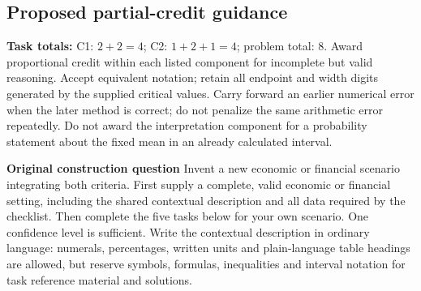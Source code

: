 \secInicio[][sec:p2]

\clearpage

\subsection*{Proposed partial-credit guidance}
\textbf{Task totals:} C1: $2+2=4$; C2: $1+2+1=4$; problem total: 8. Award proportional credit within each listed component for incomplete but valid reasoning. Accept equivalent notation; retain all endpoint and width digits generated by the supplied critical values. Carry forward an earlier numerical error when the later method is correct; do not penalize the same arithmetic error repeatedly. Do not award the interpretation component for a probability statement about the fixed mean in an already calculated interval.


\secInicio[][sec:p2]

\clearpage


\textbf{Original construction question}
Invent a new economic or financial scenario integrating both criteria. First supply a complete, valid economic or financial setting, including the shared contextual description and all data required by the checklist. Then complete the five tasks below for your own scenario. One confidence level is sufficient. Write the contextual description in ordinary language: numerals, percentages, written units and plain-language table headings are allowed, but reserve symbols, formulas, inequalities and interval notation for task reference material and solutions.

